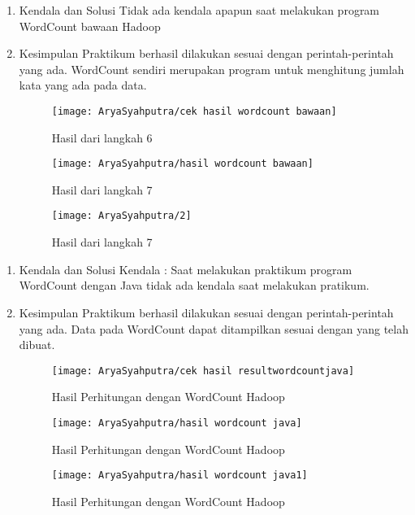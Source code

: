 \clearpage
{}
\begin{enumerate}
\item Kendala dan Solusi
\newline Tidak ada kendala apapun saat melakukan program WordCount bawaan Hadoop

\item Kesimpulan
\newline Praktikum berhasil dilakukan sesuai dengan perintah-perintah yang ada. WordCount sendiri merupakan program untuk menghitung jumlah kata yang ada pada data.


\begin{figure}[!ht]
\texttt{[image: AryaSyahputra/cek hasil wordcount bawaan]}
\caption{Hasil dari langkah 6}
\label{gam:wordcount bawaan}
\end{figure}
\begin{figure}[!ht]
\texttt{[image: AryaSyahputra/hasil wordcount bawaan]}
\caption{Hasil dari langkah 7}
\label{gam:wordcount bawaan}
\end{figure}
\begin{figure}[!ht]
\texttt{[image: AryaSyahputra/2]}
\caption{Hasil dari langkah 7}
\label{gam:wordcount bawaan}
\end{figure}
\end{enumerate}


\clearpage
{}
\begin{enumerate}
\item Kendala dan Solusi
\newline Kendala :
Saat melakukan praktikum program WordCount dengan Java tidak ada kendala saat melakukan pratikum.

\item Kesimpulan
\newline Praktikum berhasil dilakukan sesuai dengan perintah-perintah yang ada. Data pada WordCount dapat ditampilkan sesuai dengan yang telah dibuat.


\begin{figure}[!ht]
\texttt{[image: AryaSyahputra/cek hasil resultwordcountjava]}
\caption{Hasil Perhitungan dengan WordCount Hadoop}
\label{gam:result wordcount java}
\end{figure}
\begin{figure}[!ht]
\texttt{[image: AryaSyahputra/hasil wordcount java]}
\caption{Hasil Perhitungan dengan WordCount Hadoop}
\label{gam:result wordcount java}
\end{figure}
\begin{figure}[!ht]
\texttt{[image: AryaSyahputra/hasil wordcount java1]}
\caption{Hasil Perhitungan dengan WordCount Hadoop}
\label{gam:result wordcount java}
\end{figure}

\end{enumerate}


